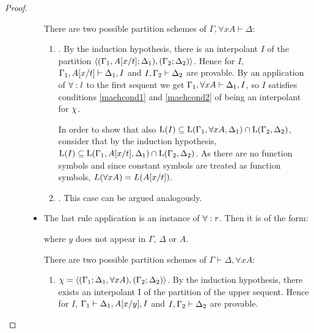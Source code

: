 \begin{proof}
\begin{description}
\begin{itemize}
					There are two possible partition schemes of $\Gamma, \forall x A \vdash \Delta$:
					\begin{enumerate}
						\item {}.
							By the induction hypothesis, there is an interpolant $I$ of the partition $ \langle (\Gamma_1, A[x/t]; \Delta_1), (\Gamma_2; \Delta_2)\rangle $.
							Hence for $I$, 
							$\Gamma_1, A[x/t] \vdash \Delta_1, I$ and  
							$I, \Gamma_2 \vdash \Delta_2$ are provable.
							By an application of $\forall:l$ to the first sequent we get $\Gamma_1, \forall x A\vdash \Delta_1, I$, so $I$ satisfies conditions \ref{maehcond1} and \ref{maehcond2} of being an interpolant for $\chi$.

							In order to show that also $\operatorname{L}(I) \subseteq \operatorname{L}(\Gamma_1, \forall x A, \Delta_1) \cap \operatorname{L}(\Gamma_2, \Delta_2)$, consider that by the induction hypothesis, 
							$\operatorname{L}(I) \subseteq \operatorname{L}(\Gamma_1, A[x/t], \Delta_1) \cap \operatorname{L}(\Gamma_2, \Delta_2)$.
							As there are no function symbols and since constant symbols are treated as function symbols, $L(\forall x A) = L(A[x/t])$.


						\item {}.
							This case can be argued analogously.
					\end{enumerate}

				\item The last rule application is an instance of $\forall:r$. Then it is of the form:
					\begin{prooftree}
					\end{prooftree}
					where $y$ does not appear in $\Gamma$, $\Delta$ or $A$.

					There are two possible partition schemes of $\Gamma\vdash \Delta, \forall x A $:
					\begin{enumerate}
						\item $\chi =  \langle (\Gamma_1; \Delta_1, \forall x A), (\Gamma_2; \Delta_2)\rangle $.
							By the induction hypothesis, there exists an interpolant I of the partition 
							 of the upper sequent.
							Hence for $I$, 
							$\Gamma_1 \vdash \Delta_1, A[x/y], I$ and
							$I, \Gamma_2 \vdash \Delta_2$ are provable.


\end{enumerate}
\end{itemize}
\end{description}
\end{proof}
